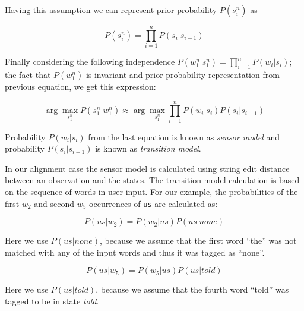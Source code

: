 \begin{center}
Having this assumption we can represent prior probability $P(s_{i}^{n})$ as
\end{center}
\begin{large}
\begin{equation}
P(s_{i}^{n}) = \prod^{n}_{i=1} P(s_{i}|s_{i-1})
\end{equation}
\end{large}

\begin{center}
Finally considering the following independence $P(w_{1}^{n}|s_{1}^{n}) = \prod_{i=1}^{n}P(w_{i}|s_{i})$; the fact that $P(w_{1}^{n})$ is invariant and prior probability representation from previous equation, we get this expression:
\end{center}
\begin{large}
\begin{equation}
\arg \max_{s_{1}^{n}} P(s_{1}^{n}|w_{1}^{n}) \approx  \arg \max_{s_{1}^{n}} \prod^{n}_{i=1} P(w_{i}|s_{i}) P(s_{i}|s_{i-1})
\end{equation}
\end{large}
\begin{center}
Probability $P(w_{i}|s_{i})$ from the last equation is known as \emph{sensor model} and probability $P(s_{i}|s_{i-1})$ is known as \emph{transition model}.
\end{center}

In our alignment case the sensor model is calculated using string edit distance between an observation and the states. The transition model calculation is based on the sequence of words in user input. For our example, the probabilities of the first $w_{2}$ and second $w_{5}$ occurrences of \texttt{us} are calculated as: 

\begin{large}
\begin{equation}
P(us|w_{2}) = P(w_{2}|us) P(us|none)
\end{equation}
\end{large}
\begin{center}
Here we use $P(us|none)$, because we assume that the first word ``the'' was not matched with any of the input words and thus it was tagged as ``none''.
\end{center}

\begin{large}
\begin{equation}
P(us|w_{5}) = P(w_{5}|us) P(us|told)
\end{equation}
\end{large}
\begin{center}
Here we use $P(us|told)$, because we assume that the fourth word ``told'' was tagged to be in state \emph{told}.
\end{center}


